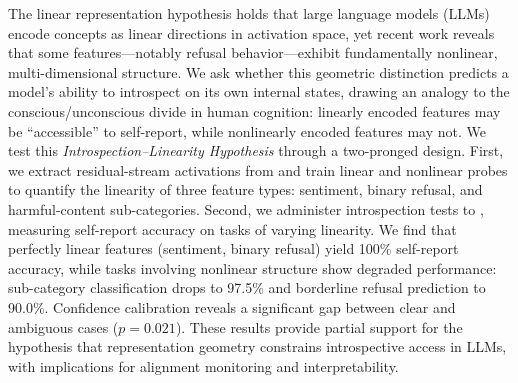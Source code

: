 The linear representation hypothesis holds that large language models (LLMs) encode concepts as linear directions in activation space, yet recent work reveals that some features---notably refusal behavior---exhibit fundamentally nonlinear, multi-dimensional structure. We ask whether this geometric distinction predicts a model's ability to introspect on its own internal states, drawing an analogy to the conscious/unconscious divide in human cognition: linearly encoded features may be ``accessible'' to self-report, while nonlinearly encoded features may not. We test this \emph{Introspection--Linearity Hypothesis} through a two-pronged design. First, we extract residual-stream activations from \qwen and train linear and nonlinear probes to quantify the linearity of three feature types: sentiment, binary refusal, and harmful-content sub-categories. Second, we administer introspection tests to \gptfour, measuring self-report accuracy on tasks of varying linearity. We find that perfectly linear features (sentiment, binary refusal) yield 100\% self-report accuracy, while tasks involving nonlinear structure show degraded performance: sub-category classification drops to 97.5\% and borderline refusal prediction to 90.0\%. Confidence calibration reveals a significant gap between clear and ambiguous cases ($p = 0.021$). These results provide partial support for the hypothesis that representation geometry constrains introspective access in LLMs, with implications for alignment monitoring and interpretability.
